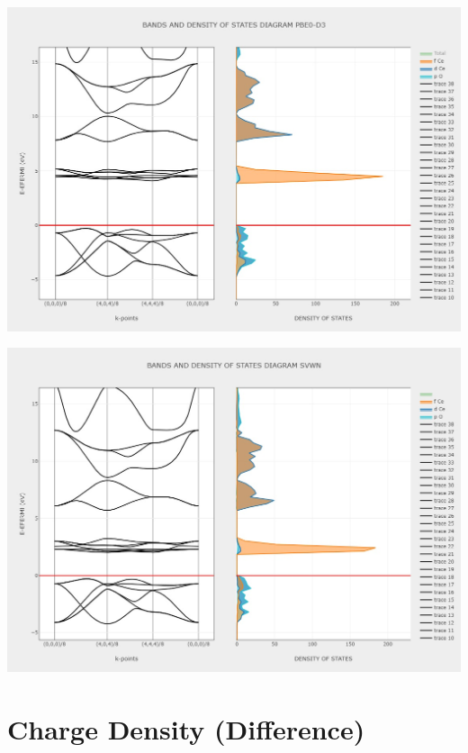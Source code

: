 \documentclass{article}
\begin{document}
\noindent\begin{minipage}{0.45\textwidth}
	\centering
	\includegraphics[width=1\textwidth]{../images/correct_band_and_dos/BAND AND DOSS PBE0-D3.jpeg}
    \label{fig:BANDDOS_PBE0D3}
\end{minipage}
\hfill
\begin{minipage}{0.45\textwidth}
	\centering
	\includegraphics[width=1\textwidth]{../images/correct_band_and_dos/BAND AND DOSS SVWN.jpeg}
    \label{fig:BANDDOS_SVWN}
\end{minipage}

\newpage
\section{Charge Density (Difference)}
\end{document}
